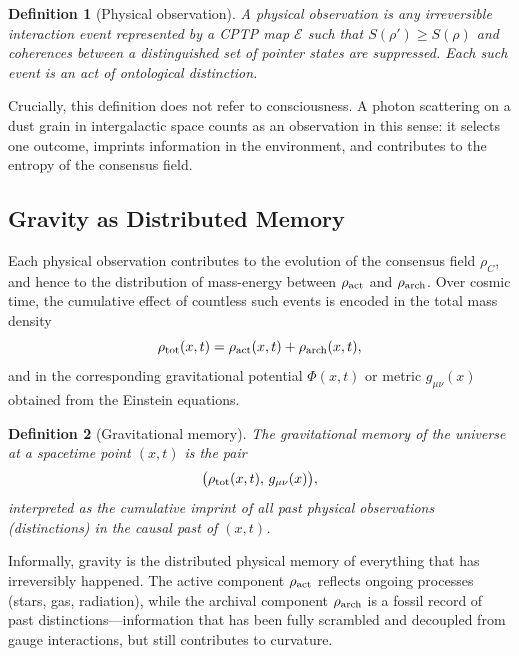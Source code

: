 \documentclass[12pt,a4paper]{article}
\newtheorem{definition}{Definition}
\begin{document}
\begin{definition}[Physical observation]
A \emph{physical observation} is any irreversible interaction event represented by a CPTP map $\mathcal{E}$ such that $S(\rho') \geq S(\rho)$ and coherences between a distinguished set of pointer states are suppressed. Each such event is an act of ontological distinction.
\end{definition}

Crucially, this definition does not refer to consciousness. A photon scattering on a dust grain in intergalactic space counts as an observation in this sense: it selects one outcome, imprints information in the environment, and contributes to the entropy of the consensus field.

\subsection{Gravity as Distributed Memory}
\label{subsec:grav_memory}

Each physical observation contributes to the evolution of the consensus field $\rho_C$, and hence to the distribution of mass-energy between $\rho_{\rm act}$ and $\rho_{\rm arch}$. Over cosmic time, the cumulative effect of countless such events is encoded in the total mass density
\begin{equation}
  \rho_{\rm tot}(x,t) = \rho_{\rm act}(x,t) + \rho_{\rm arch}(x,t),
\end{equation}
and in the corresponding gravitational potential $\Phi(x,t)$ or metric $g_{\mu\nu}(x)$ obtained from the Einstein equations.

\begin{definition}[Gravitational memory]
The \emph{gravitational memory} of the universe at a spacetime point $(x,t)$ is the pair
\begin{equation}
  \bigl(\rho_{\rm tot}(x,t),\, g_{\mu\nu}(x)\bigr),
\end{equation}
interpreted as the cumulative imprint of all past physical observations (distinctions) in the causal past of $(x,t)$.
\end{definition}

Informally, gravity is the distributed physical memory of everything that has irreversibly happened. The active component $\rho_{\rm act}$ reflects ongoing processes (stars, gas, radiation), while the archival component $\rho_{\rm arch}$ is a fossil record of past distinctions---information that has been fully scrambled and decoupled from gauge interactions, but still contributes to curvature.
\end{document}
